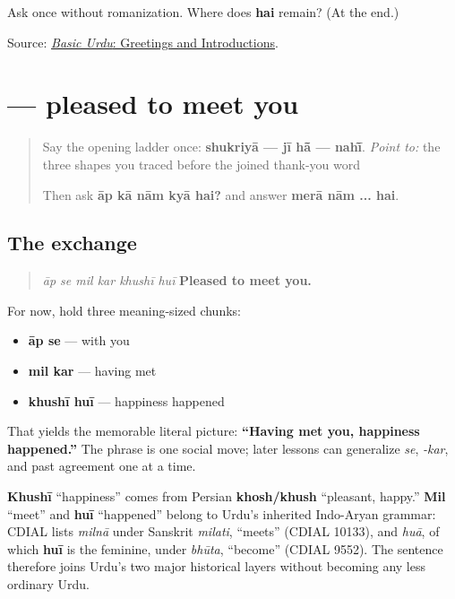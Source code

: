 \begin{tcolorbox}[breakable,colback=teal!4,colframe=teal!35!black,title={Before you move on}]
Ask once without romanization. Where does \textbf{hai} remain? (At the end.)

Source: \href{https://openbooks.lib.msu.edu/urdu/chapter/2-2/}{\emph{Basic Urdu}: Greetings and Introductions}.
\end{tcolorbox}
\section[\texorpdfstring{\ur{آپ} \ur{سے} \ur{مل} \ur{کر} \ur{خوشی} … (āp se mil kar …)}{آپ سے مل کر خوشی … (āp se mil kar …)}]{      — pleased to meet you}

\label{lesson:UR-C03-khushi-hui}



\begin{quote}
Say the opening ladder once: \textbf{shukriyā — jī hā̃ — nahī̃}. \emph{Point to:} the three shapes you traced before the joined thank-you word

Then ask \textbf{āp kā nām kyā hai?} and answer \textbf{merā nām ... hai}.
\end{quote}

\subsection*{The exchange}
\begin{quote}
\textbf{     } \emph{āp se mil kar khushī huī} \textbf{Pleased to meet you.}
\end{quote}

For now, hold three meaning-sized chunks:

\begin{itemize}
\raggedright
  \item \textbf{āp se} — with you
  \item \textbf{mil kar} — having met
  \item \textbf{khushī huī} — happiness happened
\end{itemize}

That yields the memorable literal picture: \textbf{“Having met you, happiness happened.”} The phrase is one social move; later lessons can generalize \emph{se}, \emph{-kar}, and past agreement one at a time.

\begin{cousinweb}
\textbf{Khushī} “happiness” comes from Persian \textbf{khosh/khush} “pleasant, happy.” \textbf{Mil} “meet” and \textbf{huī} “happened” belong to Urdu's inherited Indo-Aryan grammar: CDIAL lists \emph{milnā} under Sanskrit \emph{milati}, “meets” (CDIAL 10133), and \emph{huā}, of which \textbf{huī} is the feminine, under \emph{bhūta}, “become” (CDIAL 9552). The sentence therefore joins Urdu's two major historical layers without becoming any less ordinary Urdu.
\end{cousinweb}

